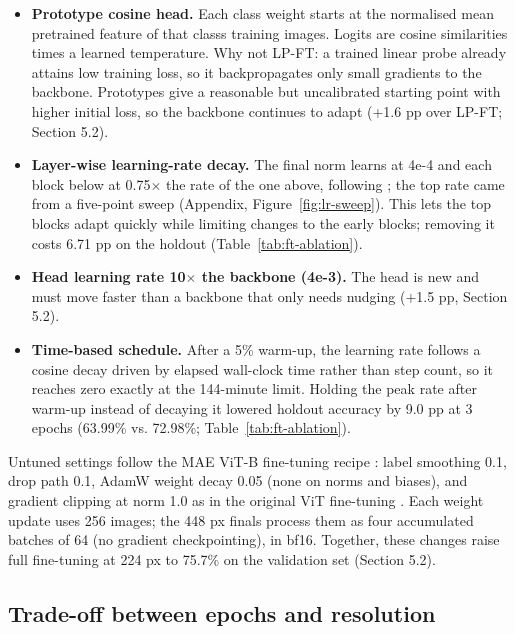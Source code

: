 \begin{itemize}
\item
  \textbf{Prototype cosine head.} Each class weight starts at the normalised mean pretrained feature of that class\textquotesingle s training images. Logits are cosine similarities times a learned temperature. Why not LP-FT: a trained linear probe already attains low training loss, so it backpropagates only small gradients to the backbone. Prototypes give a reasonable but uncalibrated starting point with higher initial loss, so the backbone continues to adapt (+1.6 pp over LP-FT; Section 5.2).
\item
  \textbf{Layer-wise learning-rate decay.} The final norm learns at 4e-4 and each block below at 0.75$\times$ the rate of the one above, following \citet{he2022mae}; the top rate came from a five-point sweep (Appendix, Figure~\ref{fig:lr-sweep}). This lets the top blocks adapt quickly while limiting changes to the early blocks; removing it costs 6.71 pp on the holdout (Table~\ref{tab:ft-ablation}).
\item
  \textbf{Head learning rate 10$\times$ the backbone (4e-3).} The head is new and must move faster than a backbone that only needs nudging (+1.5 pp, Section 5.2).
\item
  \textbf{Time-based schedule.} After a 5\% warm-up, the learning rate follows a cosine decay driven by elapsed wall-clock time rather than step count, so it reaches zero exactly at the 144-minute limit. Holding the peak rate after warm-up instead of decaying it lowered holdout accuracy by 9.0 pp at 3 epochs (63.99\% vs. 72.98\%; Table~\ref{tab:ft-ablation}).
\end{itemize}

Untuned settings follow the MAE ViT-B fine-tuning recipe \citep{he2022mae}: label smoothing 0.1, drop path 0.1, AdamW weight decay 0.05 (none on norms and biases), and gradient clipping at norm 1.0 as in the original ViT fine-tuning \citep{dosovitskiy2021vit}. Each weight update uses 256 images; the 448 px finals process them as four accumulated batches of 64 (no gradient checkpointing), in bf16. Together, these changes raise full fine-tuning at 224 px to 75.7\% on the validation set (Section 5.2).

\subsection{Trade-off between epochs and resolution}\label{trade-off-between-epochs-and-resolution}

